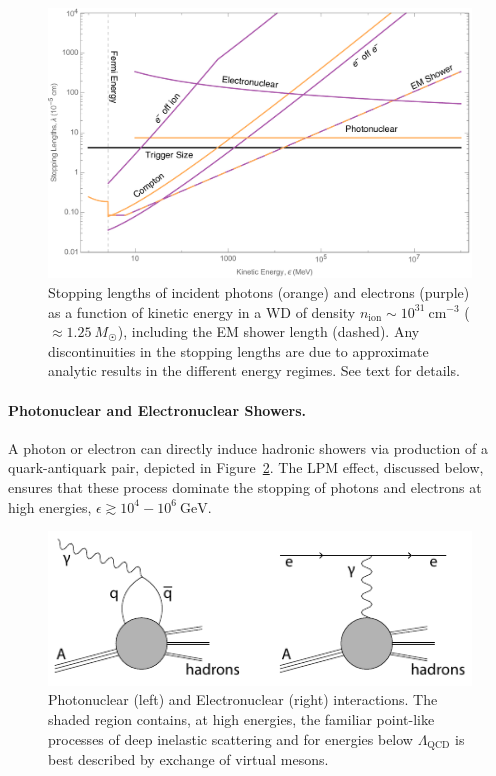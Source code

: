 \documentclass[preprintnumbers,amsmath,amssymb,prd,superscriptaddress]{revtex4}
\newcommand{\GeV}{\text{GeV}}
\newcommand{\x}[1]{\ensuremath{\text{#1}}} %
\begin{document}
\begin{figure}
\includegraphics[scale=.35]{SPhighEM.pdf}
\caption{Stopping lengths of incident photons (orange) and electrons (purple) as a function of kinetic energy in a WD of density $n_\text{ion} \sim 10^{31}~\text{cm}^{-3}$ ($\approx 1.25 ~M_{\astrosun}$), including the EM shower length (dashed).
Any discontinuities in the stopping lengths are due to approximate analytic results in the different energy regimes.
See text for details.
}
\label{fig:SPhighEM}
\end{figure}


\paragraph{Photonuclear and Electronuclear Showers.}
A photon or electron can directly induce hadronic showers via production of a quark-antiquark pair, depicted in Figure~\ref{fig:electrophotonuclear-diagram}.
The LPM effect, discussed below, ensures that these process dominate the stopping of photons and electrons at high energies, $\epsilon \gtrsim 10^4-10^6~\GeV$.

\begin{figure}
\includegraphics[scale=1.0]{electrophotonuclear-diagram.pdf}
\caption{Photonuclear (left) and Electronuclear (right) interactions. The shaded region contains, at high energies, the familiar point-like processes of deep inelastic scattering and for energies below $\Lambda_\x{QCD}$ is best described by exchange of virtual mesons.}
\label{fig:electrophotonuclear-diagram}
\end{figure}
\end{document}
